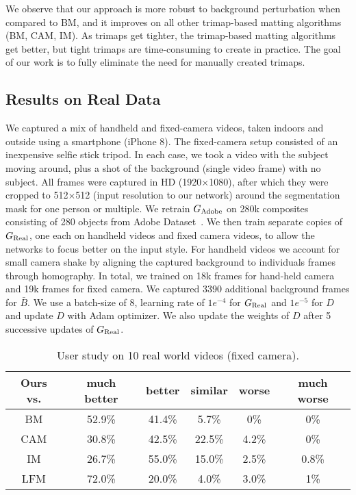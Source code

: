 \documentclass[10pt,twocolumn,letterpaper]{article}
\begin{document}
We observe that our approach is more robust to background perturbation when compared to BM, and it improves on all other trimap-based matting algorithms (BM, CAM, IM). As trimaps get tighter, the trimap-based matting algorithms get better, but tight trimaps are time-consuming to create in practice. The goal of our work is to fully eliminate the need for manually created trimaps. 









\subsection{Results on Real Data}
\label{sec:real}



We captured a mix of handheld and fixed-camera videos, taken indoors and outside using a smartphone (iPhone 8).  The fixed-camera setup consisted of an inexpensive selfie stick tripod. In each case, we took a video with the subject moving around, plus a shot of the background (single video frame) with no subject.  All frames were captured in HD (1920$\times$1080), after which they were cropped to 512$\times$512 (input resolution to our network) around the segmentation mask for one person or multiple. We retrain $G_{\rm Adobe}$ on 280k composites consisting of 280 objects from Adobe Dataset~\cite{xu2017deep}. We then train separate copies of $G_{\rm Real}$, one each on handheld videos and fixed camera videos, to allow the networks to focus better on the input style. For handheld videos we account for small camera shake by  aligning the captured background to individuals frames through homography.  In total, we trained on 18k frames for hand-held camera and 19k frames for fixed camera. We captured 3390 additional background frames for $\bar{B}$. We use a batch-size of 8, learning rate of $1e^{-4}$ for $G_{\rm Real}$ and $1e^{-5}$ for $D$ and update $D$ with Adam optimizer. We also update the weights of $D$ after 5 successive updates of $G_{\rm Real}$.

\begin{table}[!h]
\vspace{-0.5em}
\setlength\tabcolsep{2pt}
	\centering
\small
	\captionsetup{justification=centering}
    	\vspace{-.5em}
		\begin{tabular}{c|ccccc}
			\toprule
			 Ours vs. &  much better & better & similar & worse & much worse \\ 
			 \midrule
			 BM & 52.9\% & 41.4\% & 5.7\% & 0\% & 0\%\\
			 CAM & 30.8\% & 42.5\% & 22.5\% & 4.2\% & 0\%\\
			 IM & 26.7\% & 55.0\% & 15.0\% & 2.5\% & 0.8\%\\
			 LFM & 72.0\% & 20.0\% & 4.0\% & 3.0\% & 1\%\\
			\bottomrule
		\end{tabular}
		\vspace{-.5em}
		\caption{\small User study on 10 real world videos (fixed camera).}
	\vspace{-1.5em}
	\label{tab:real-fixed}
\end{table}
\end{document}
